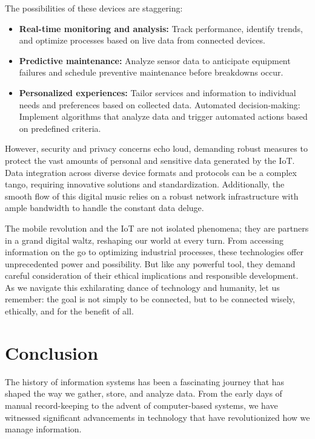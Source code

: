 \documentclass[
  letterpaper,
  DIV=11,
  numbers=noendperiod]{scrreprt}
\providecommand{\tightlist}{%
  \setlength{\itemsep}{0pt}\setlength{\parskip}{0pt}}\usepackage{longtable,booktabs,array}
\begin{document}
The possibilities of these devices are staggering:

\begin{itemize}
\tightlist
\item
  \textbf{Real-time monitoring and analysis:} Track performance,
  identify trends, and optimize processes based on live data from
  connected devices.
\item
  \textbf{Predictive maintenance:} Analyze sensor data to anticipate
  equipment failures and schedule preventive maintenance before
  breakdowns occur.
\item
  \textbf{Personalized experiences:} Tailor services and information to
  individual needs and preferences based on collected data. Automated
  decision-making: Implement algorithms that analyze data and trigger
  automated actions based on predefined criteria.
\end{itemize}

However, security and privacy concerns echo loud, demanding robust
measures to protect the vast amounts of personal and sensitive data
generated by the IoT. Data integration across diverse device formats and
protocols can be a complex tango, requiring innovative solutions and
standardization. Additionally, the smooth flow of this digital music
relies on a robust network infrastructure with ample bandwidth to handle
the constant data deluge.

The mobile revolution and the IoT are not isolated phenomena; they are
partners in a grand digital waltz, reshaping our world at every turn.
From accessing information on the go to optimizing industrial processes,
these technologies offer unprecedented power and possibility. But like
any powerful tool, they demand careful consideration of their ethical
implications and responsible development. As we navigate this
exhilarating dance of technology and humanity, let us remember: the goal
is not simply to be connected, but to be connected wisely, ethically,
and for the benefit of all.

\section{Conclusion}\label{conclusion}

The history of information systems has been a fascinating journey that
has shaped the way we gather, store, and analyze data. From the early
days of manual record-keeping to the advent of computer-based systems,
we have witnessed significant advancements in technology that have
revolutionized how we manage information.
\end{document}
